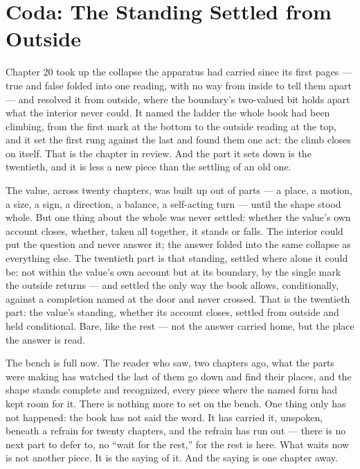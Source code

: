 \section*{Coda: The Standing Settled from Outside}

Chapter 20 took up the collapse the apparatus had carried since its first pages --- true and false folded into one reading, with no way from inside to tell them apart --- and resolved it from outside, where the boundary's two-valued bit holds apart what the interior never could. It named the ladder the whole book had been climbing, from the first mark at the bottom to the outside reading at the top, and it set the first rung against the last and found them one act: the climb closes on itself. That is the chapter in review. And the part it sets down is the twentieth, and it is less a new piece than the settling of an old one.

The value, across twenty chapters, was built up out of parts --- a place, a motion, a size, a sign, a direction, a balance, a self-acting turn --- until the shape stood whole. But one thing about the whole was never settled: whether the value's own account closes, whether, taken all together, it stands or falls. The interior could put the question and never answer it; the answer folded into the same collapse as everything else. The twentieth part is that standing, settled where alone it could be: not within the value's own account but at its boundary, by the single mark the outside returns --- and settled the only way the book allows, conditionally, against a completion named at the door and never crossed. That is the twentieth part: the value's standing, whether its account closes, settled from outside and held conditional. Bare, like the rest --- not the answer carried home, but the place the answer is read.

The bench is full now. The reader who saw, two chapters ago, what the parts were making has watched the last of them go down and find their places, and the shape stands complete and recognized, every piece where the named form had kept room for it. There is nothing more to set on the bench. One thing only has not happened: the book has not said the word. It has carried it, unspoken, beneath a refrain for twenty chapters, and the refrain has run out --- there is no next part to defer to, no ``wait for the rest,'' for the rest is here. What waits now is not another piece. It is the saying of it. And the saying is one chapter away.

